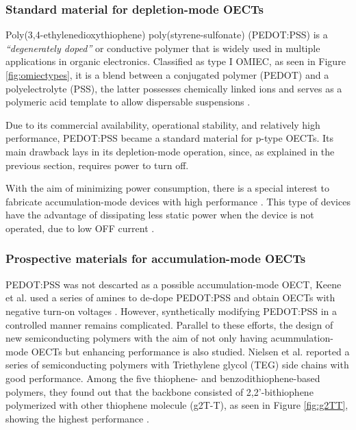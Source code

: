 \subsubsection{Standard material for depletion-mode OECTs}

Poly(3,4-ethylenedioxythiophene) poly(styrene-sulfonate) (PEDOT:PSS) is a \textit{``degenerately doped''} \cite{bernardsSteadyStateTransientBehavior2007} or conductive polymer that is widely used in multiple applications in organic electronics. Classified as type I OMIEC, as seen in Figure \ref{fig:omiectypes}, it is a blend between a conjugated polymer (PEDOT) and a polyelectrolyte (PSS), the latter possesses chemically linked ions and serves as a polymeric acid template to allow dispersable suspensions \cite{paulsenOrganicMixedIonic2020}.

Due to its commercial availability, operational stability, and relatively high performance, PEDOT:PSS became a standard material for p-type OECTs. Its main drawback lays in its depletion-mode operation, since, as explained in the previous section, requires power to turn off. 

With the aim of minimizing power consumption, there is a special interest to fabricate accumulation-mode devices with high performance \cite{nielsenMolecularDesignSemiconducting2016}\cite{tanOrganicMixedIonic2022}\cite{inalBenchmarkingOrganicMixed2017}\cite{keeneEnhancementModePEDOTPSS2020}. This type of devices have the advantage of dissipating less static power when the device is not operated, due to low OFF current %
\cite{giovannittiEnergeticControlRedoxActive2020}.

\subsubsection{Prospective materials for accumulation-mode OECTs}
PEDOT:PSS was not descarted as a possible accumulation-mode OECT, Keene et al. used a series of amines to de-dope PEDOT:PSS and obtain OECTs with negative turn-on voltages \cite{keeneEnhancementModePEDOTPSS2020}. However, synthetically modifying PEDOT:PSS in a controlled manner remains complicated. Parallel to these efforts, the design of new semiconducting polymers with the aim of not only having acummulation-mode OECTs but enhancing performance is also studied. Nielsen et al. reported a series of semiconducting polymers with Triethylene glycol (TEG) side chains with good performance. Among the five thiophene- and benzodithiophene-based polymers, they found out that the %
backbone consisted of 2,2'-bithiophene polymerized with other thiophene molecule (g2T-T), as seen in Figure \ref{fig:g2TT}, showing the highest performance %
\cite{nielsenMolecularDesignSemiconducting2016}.

